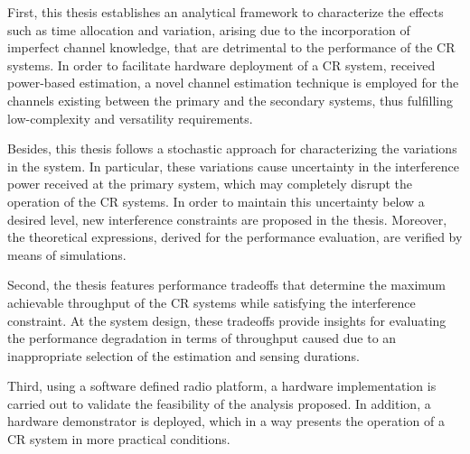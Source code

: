 First, this thesis establishes an analytical framework to characterize the effects such as time allocation and variation, arising due to the incorporation of imperfect channel knowledge, that are detrimental to the performance of the CR systems. In order to facilitate hardware deployment of a CR system, received power-based estimation, a novel channel estimation technique is employed for the channels existing between the primary and the secondary systems, thus fulfilling low-complexity and versatility requirements. 

Besides, this thesis follows a stochastic approach for characterizing the variations in the system. In particular, these variations cause uncertainty in the interference power received at the primary system, which may completely disrupt the operation of the CR systems. In order to maintain this uncertainty below a desired level, new interference constraints are proposed in the thesis. Moreover, the theoretical expressions, derived for the performance evaluation, are verified by means of simulations. 




Second, the thesis features performance tradeoffs that determine the maximum achievable throughput of the CR systems while satisfying the interference constraint. At the system design, these tradeoffs provide insights for evaluating the performance degradation in terms of throughput caused due to an inappropriate selection of the estimation and sensing durations. 

Third, using a software defined radio platform, a hardware implementation is carried out to validate the feasibility of the analysis proposed. In addition, a hardware demonstrator is deployed, which in a way presents the operation of a CR system in more practical conditions. %



\cleardoublepage
